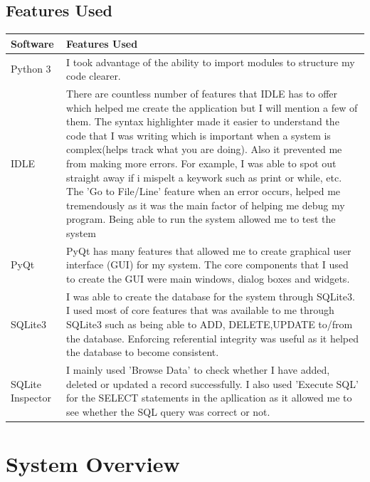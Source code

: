 \subsection{Features Used}

\begin{center}
\begin{tabular}{|p{4cm}|p{8.5cm}|}
\hline
\textbf{Software} & \textbf{Features Used} \\ \hline

Python 3 & I took advantage of the ability to import modules to structure my code clearer.  \\ \hline
IDLE & There are countless number of features that IDLE has to offer which helped me create the application but I will mention a few of them. The syntax highlighter made it easier to understand the code that I was writing which is important when a system is complex(helps track what you are doing). Also it prevented me from making more errors. For example, I was able to spot out straight away if i mispelt a keywork such as print or while, etc. The 'Go to File/Line' feature when an error occurs, helped me tremendously as it was the main factor of helping me debug my program. Being able to run the system allowed me to test the system \\ \hline
PyQt& PyQt has many features that allowed me to create graphical user interface (GUI) for my system. The core components that I used to create the GUI were main windows, dialog boxes and widgets. \\ \hline
SQLite3 &I was able to create the database for the system through SQLite3. I used most of core features that was available to me through SQLite3 such as being able to ADD, DELETE,UPDATE to/from the database. Enforcing referential integrity was useful as it helped the database to become consistent.   \\ \hline
SQLite Inspector& I mainly used 'Browse Data' to check whether I have added, deleted or updated a record successfully. I also used 'Execute SQL' for the SELECT statements in the apllication as it allowed me to see whether the SQL query was correct or not.  \\ \hline

\end{tabular}
\end{center}

\section{System Overview}

